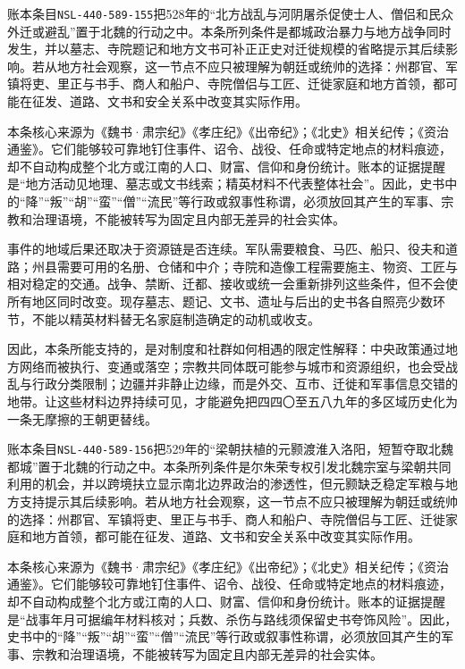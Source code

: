 账本条目\texttt{NSL-440-589-155}把528年的“北方战乱与河阴屠杀促使士人、僧侣和民众外迁或避乱”置于北魏的行动之中。本条所列条件是都城政治暴力与地方战争同时发生，并以墓志、寺院题记和地方文书可补正正史对迁徙规模的省略提示其后续影响。若从地方社会观察，这一节点不应只被理解为朝廷或统帅的选择：州郡官、军镇将吏、里正与书手、商人和船户、寺院僧侣与工匠、迁徙家庭和地方首领，都可能在征发、道路、文书和安全关系中改变其实际作用。

本条核心来源为《魏书·肃宗纪》《孝庄纪》《出帝纪》；《北史》相关纪传；《资治通鉴》。它们能够较可靠地钉住事件、诏令、战役、任命或特定地点的材料痕迹，却不自动构成整个北方或江南的人口、财富、信仰和身份统计。账本的证据提醒是“地方活动见地理、墓志或文书线索；精英材料不代表整体社会”。因此，史书中的“降”“叛”“胡”“蛮”“僧”“流民”等行政或叙事性称谓，必须放回其产生的军事、宗教和治理语境，不能被转写为固定且内部无差异的社会实体。

事件的地域后果还取决于资源链是否连续。军队需要粮食、马匹、船只、役夫和道路；州县需要可用的名册、仓储和中介；寺院和造像工程需要施主、物资、工匠与相对稳定的交通。战争、禁断、迁都、接收或统一会重新排列这些条件，但不会使所有地区同时改变。现存墓志、题记、文书、遗址与后出的史书各自照亮少数环节，不能以精英材料替无名家庭制造确定的动机或收支。

因此，本条所能支持的，是对制度和社群如何相遇的限定性解释：中央政策通过地方网络而被执行、变通或落空；宗教共同体既可能参与城市和资源组织，也会受战乱与行政分类限制；边疆并非静止边缘，而是外交、互市、迁徙和军事信息交错的地带。让这些材料边界持续可见，才能避免把四四〇至五八九年的多区域历史化为一条无摩擦的王朝更替线。

账本条目\texttt{NSL-440-589-156}把529年的“梁朝扶植的元颢渡淮入洛阳，短暂夺取北魏都城”置于北魏的行动之中。本条所列条件是尔朱荣专权引发北魏宗室与梁朝共同利用的机会，并以跨境扶立显示南北边界政治的渗透性，但元颢缺乏稳定军粮与地方支持提示其后续影响。若从地方社会观察，这一节点不应只被理解为朝廷或统帅的选择：州郡官、军镇将吏、里正与书手、商人和船户、寺院僧侣与工匠、迁徙家庭和地方首领，都可能在征发、道路、文书和安全关系中改变其实际作用。

本条核心来源为《魏书·肃宗纪》《孝庄纪》《出帝纪》；《北史》相关纪传；《资治通鉴》。它们能够较可靠地钉住事件、诏令、战役、任命或特定地点的材料痕迹，却不自动构成整个北方或江南的人口、财富、信仰和身份统计。账本的证据提醒是“战事年月可据编年材料核对；兵数、杀伤与路线须保留史书夸饰风险”。因此，史书中的“降”“叛”“胡”“蛮”“僧”“流民”等行政或叙事性称谓，必须放回其产生的军事、宗教和治理语境，不能被转写为固定且内部无差异的社会实体。

